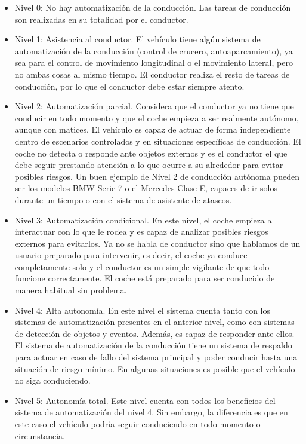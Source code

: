 \begin{itemize}
\item Nivel 0: No hay automatización de la conducción. Las tareas de conducción son realizadas en su totalidad por el conductor.
\item	Nivel 1: Asistencia al conductor. El vehículo tiene algún sistema de automatización de la conducción (control de crucero, autoaparcamiento), ya sea para el control de movimiento longitudinal o el movimiento lateral, pero no ambas cosas al mismo tiempo. El conductor realiza el resto de tareas de conducción, por lo que el conductor debe estar siempre atento.
\item	Nivel 2: Automatización parcial. Considera que el conductor ya no tiene que conducir en todo momento y que el coche empieza a ser realmente autónomo, aunque con matices. El vehículo es capaz de actuar de forma independiente dentro de escenarios controlados y en situaciones específicas de conducción. El coche no detecta o responde ante objetos externos y es el conductor el que debe seguir prestando atención a lo que ocurre a su alrededor para evitar posibles riesgos. Un buen ejemplo de Nivel 2 de conducción autónoma pueden ser los modelos BMW Serie 7 o el Mercedes Clase E, capaces de ir solos durante un tiempo o con el sistema de asistente de atascos.
\item	Nivel 3: Automatización condicional. En este nivel, el coche empieza a interactuar con lo que le rodea y es capaz de analizar posibles riesgos externos para evitarlos. Ya no se habla de conductor sino que hablamos de un usuario preparado para intervenir, es decir, el coche ya conduce completamente solo y el conductor es un simple vigilante de que todo funcione correctamente. El coche está preparado para ser conducido de manera habitual sin problema. 
\item Nivel 4: Alta autonomía. En este nivel el sistema cuenta tanto con los sistemas de automatización presentes en el anterior nivel, como con sistemas de detección de objetos y eventos. Además, es capaz de responder ante ellos. El sistema de automatización de la conducción tiene un sistema de respaldo para actuar en caso de fallo del sistema principal y poder conducir hasta una situación de riesgo mínimo. En algunas situaciones es posible que el vehículo no siga conduciendo.
\item	Nivel 5: Autonomía total. Este nivel cuenta con todos los beneficios del sistema de automatización del nivel 4. Sin embargo, la diferencia es que en este caso el vehículo podría seguir conduciendo en todo momento o circunstancia.

\end{itemize}


